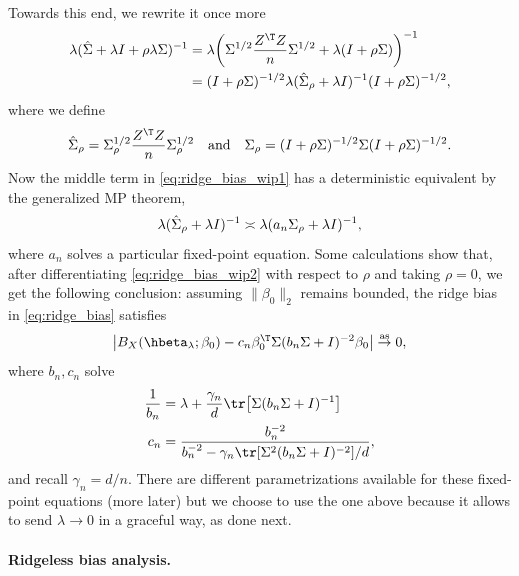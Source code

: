 \documentclass{article}
\begin{document}
Towards this end, we rewrite it once more
\begin{align}
\nonumber
\lambda (\hSigma + \lambda I + \rho \lambda \Sigma)^{-1} 
&= \lambda \bigg( \Sigma^{1/2} \frac{Z^\T Z}{n} \Sigma^{1/2} + 
  \lambda (I + \rho \Sigma) \bigg)^{-1} \\
\label{eq:ridge_bias_wip1} 
&= (I + \rho \Sigma)^{-1/2} \lambda (\hSigma_\rho + \lambda I)^{-1} 
  (I + \rho \Sigma)^{-1/2},
\end{align}
where we define
\[
\hSigma_\rho = \Sigma_\rho^{1/2} \frac{Z^\T Z}{n} \Sigma_\rho^{1/2} 
\quad \text{and} \quad 
\Sigma_\rho = (I + \rho \Sigma)^{-1/2} \Sigma (I + \rho \Sigma)^{-1/2}. 
\]
Now the middle term in \eqref{eq:ridge_bias_wip1} has a deterministic equivalent 
by the generalized MP theorem,  
\begin{equation}
\label{eq:ridge_bias_wip2}
\lambda (\hat\Sigma_\rho + \lambda I)^{-1} \asymp \lambda (a_n\Sigma_\rho + 
\lambda I)^{-1}, 
\end{equation}
where $a_n$ solves a particular fixed-point equation. Some calculations
show that, after differentiating \eqref{eq:ridge_bias_wip2} with respect to
$\rho$ and taking $\rho=0$, we get the following conclusion: assuming 
$\|\beta_0\|_2$ remains bounded, the ridge bias in \eqref{eq:ridge_bias}
satisfies 
\begin{equation}
\label{eq:ridge_bias_limit}
\big| B_X(\hbeta_\lambda; \beta_0) - c_n \beta_0^\T \Sigma (b_n \Sigma 
  + I)^{-2} \beta_0 \big| \asto 0,  
\end{equation}
where $b_n,c_n$ solve
\begin{align}
\label{eq:ridge_fp1}
\frac{1}{b_n} &= \lambda + \frac{\gamma_n}{d} \tr \big[ \Sigma (b_n \Sigma
  + I)^{-1} \big] \\  
\label{eq:ridge_fp2}
c_n &= \frac{b_n^{-2}}{b_n^{-2} - \gamma_n \tr [ \Sigma^2 (b_n
  \Sigma + I)^{-2} ] / d},
\end{align}
and recall $\gamma_n = d/n$. There are different parametrizations available for
these fixed-point equations (more later) but we choose to use the one above
because it allows to send $\lambda \to 0$ in a graceful way, as done next.

\paragraph{Ridgeless bias analysis.}
\end{document}
